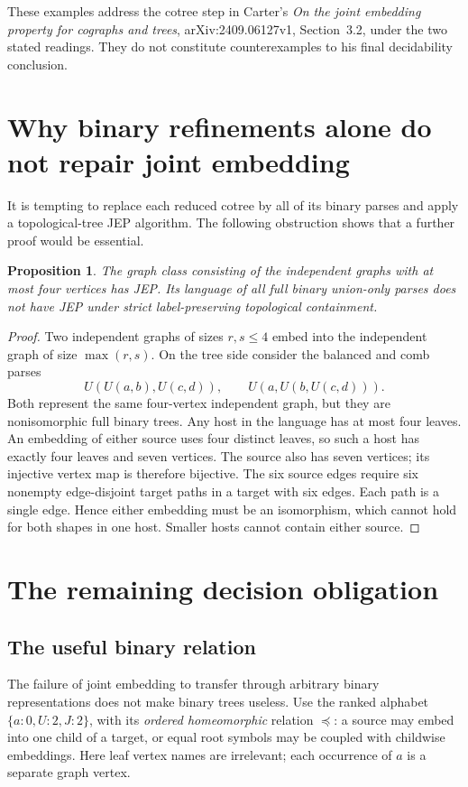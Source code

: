 \documentclass[11pt]{article}
\newtheorem{proposition}[theorem]{Proposition}
\begin{document}
These examples address the cotree step in Carter's
\emph{On the joint embedding property for cographs and trees},
arXiv:2409.06127v1, Section~3.2, under the two stated readings. They do not
constitute counterexamples to his final decidability conclusion.

\section{Why binary refinements alone do not repair joint embedding}
It is tempting to replace each reduced cotree by all of its binary parses
and apply a topological-tree JEP algorithm. The following obstruction shows
that a further proof would be essential.

\begin{proposition}\label{prop:binary}
The graph class consisting of the independent graphs with at most four
vertices has JEP. Its language of all full binary union-only parses does
not have JEP under strict label-preserving topological containment.
\end{proposition}
\begin{proof}
Two independent graphs of sizes $r,s\leq4$ embed into the independent
graph of size $\max(r,s)$. On the tree side consider the balanced and comb
parses
\[
       U(U(a,b),U(c,d)),\qquad U(a,U(b,U(c,d))).
\]
Both represent the same four-vertex independent graph, but they are
nonisomorphic full binary trees. Any host in the language has at most
four leaves. An embedding of either source uses four distinct leaves, so
such a host has exactly four leaves and seven vertices. The source also
has seven vertices; its injective vertex map is therefore bijective.
The six source edges require six nonempty edge-disjoint target paths in
a target with six edges. Each path is a single edge. Hence either
embedding must be an isomorphism, which cannot hold for both shapes in
one host. Smaller hosts cannot contain either source.
\end{proof}

\section{The remaining decision obligation}
\subsection*{The useful binary relation}
The failure of joint embedding to transfer through arbitrary binary
representations does not make binary trees useless. Use the ranked
alphabet $\{a:0,U:2,J:2\}$, with its \emph{ordered homeomorphic}
relation $\preceq$: a source may embed into one child of a target, or
equal root symbols may be coupled with childwise embeddings. Here
leaf vertex names are irrelevant; each occurrence of $a$ is a separate
graph vertex.
\end{document}
